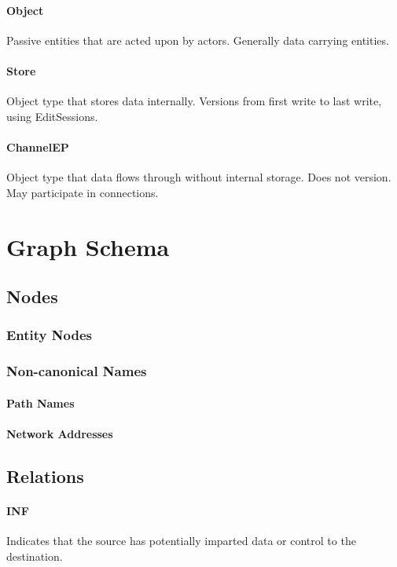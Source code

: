\documentclass[12pt,twoside,openright,a4paper]{article}
\begin{document}
\paragraph{Object}
Passive entities that are acted upon by actors. Generally data carrying entities.

\paragraph{Store}
Object type that stores data internally. Versions from first write to last write, using EditSessions.

\paragraph{ChannelEP}
Object type that data flows through without internal storage. Does not version. May participate in connections.

\section{Graph Schema}

\subsection{Nodes}

\subsubsection{Entity Nodes}

\subsubsection{Non-canonical Names}

\paragraph{Path Names}

\paragraph{Network Addresses}

\subsection{Relations}

\paragraph{INF}
Indicates that the source has potentially imparted data or control to the destination.
\end{document}

